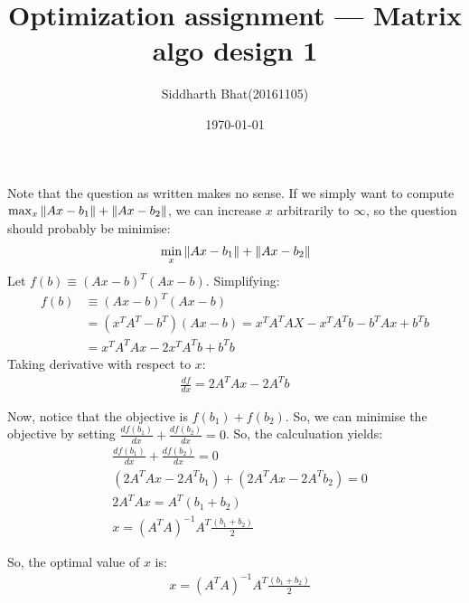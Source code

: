 \documentclass[11pt]{article}
\author{Siddharth Bhat(20161105)}
\title{Optimization assignment --- Matrix algo design 1}
\date{\today}
\renewcommand{\l}{\left}
\renewcommand{\r}{\right}
\begin{document}
\maketitle
\thispagestyle{fancy}
Note that the question as written makes no sense. If we simply want to compute
$\max_x \norm{Ax - b_1} + \norm{Ax - b_2}$, we can increase $x$ arbitrarily to
$\infty$, so the question should probably be minimise:
\begin{align*}
    &\min_x \norm{Ax - b_1} + \norm{Ax - b_2}  \\
\end{align*}
Let $f(b) \equiv (Ax - b)^T(Ax - b)$. Simplifying:
\begin{align*}
    f(b) &\equiv (Ax - b)^T(Ax - b) \\
         &= (x^TA^T - b^T)(Ax - b) = x^TA^TAX - x^TA^Tb - b^TAx + b^Tb \\
         &= x^TA^TAx - 2x^TA^Tb + b^Tb
\end{align*}
Taking derivative with respect to $x$:
\begin{align*}
    \frac{df}{dx} = 2 A^TA x - 2A^Tb
\end{align*}

Now, notice that the objective is $f(b_1) + f(b_2)$. So, we can minimise the objective
by setting $\frac{df(b_1)}{dx} + \frac{df(b_2)}{dx} = 0$. So, the calculuation
yields:
\begin{align*}
    &\frac{df(b_1)}{dx} + \frac{df(b_2)}{dx} = 0 \\
    &\l ( 2 A^TA x - 2A^Tb_1 \r) + \l( 2A^TA x - 2A^Tb_2 \r) = 0 \\
    &2 A^TA x = A^T(b_1 + b_2) \\
    &x = (A^TA)^{-1}A^T\frac{(b_1 + b_2)}{2}
\end{align*}

So, the optimal value of $x$ is:
\begin{align*}
    &x = (A^TA)^{-1}A^T\frac{(b_1 + b_2)}{2}
\end{align*}
\end{document}

